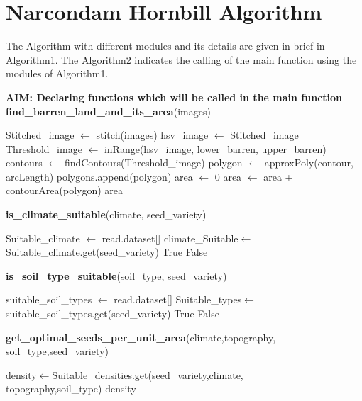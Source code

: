 \documentclass[conference]{IEEEtran}
\begin{document}
\section{Narcondam Hornbill Algorithm }
The Algorithm with different modules and its details are given in brief in Algorithm1.
\newline The Algorithm2 indicates the calling of the main function using the modules of Algorithm1.
\begin{algorithm} [ht]
\begin{scriptsize}
\begin{algorithmic}[1]
\label{algo1}

\STATE \textbf{AIM: Declaring functions which will be called in the main function}
\STATE \textbf{find\_barren\_land\_and\_its\_area}(images) 
    \begin{ALC@g}
    \STATE  Stitched\_image $\gets$ stitch(images)
    \STATE  hsv\_image $\gets$ Stitched\_image
    \STATE  Threshold\_image $\gets$ inRange(hsv\_image, lower\_barren, upper\_barren)
    \STATE  contours $\gets$ findContours(Threshold\_image)
        \STATE  polygon $\gets$ approxPoly(contour, arcLength)
        \STATE  polygons.append(polygon)
    \ENDFOR
    \STATE  area $\gets$ 0
    \STATE  area $\gets$ area + contourArea(polygon)
    \ENDFOR
    \RETURN  area
    \end{ALC@g}
\smallbreak

\STATE \textbf{is\_climate\_suitable}(climate, seed\_variety)
    \begin{ALC@g}
    \STATE Suitable\_climate $\gets$ read.dataset[]
    \STATE climate\_Suitable$\gets$Suitable\_climate.get(seed\_variety)
        \RETURN  True
    \ELSE
        \RETURN  False
    \ENDIF
    \end{ALC@g}
\smallbreak
\STATE \textbf{is\_soil\_type\_suitable}(soil\_type, seed\_variety)
    \begin{ALC@g}
    \STATE suitable\_soil\_types $\gets$ read.dataset[]
    \STATE Suitable\_types$\gets$suitable\_soil\_types.get(seed\_variety)
        \RETURN  True
    \ELSE
       \RETURN  False
    \ENDIF
    \end{ALC@g}
\smallbreak

\STATE \textbf{get\_optimal\_seeds\_per\_unit\_area}(climate,topography,\\soil\_type,seed\_variety) 
    \begin{ALC@g}
    \STATE  density$\gets$Suitable\_densities.get(seed\_variety,climate,\\topography,soil\_type)
    \RETURN  density
    \end{ALC@g}
\smallbreak


\end{algorithmic}
\end{scriptsize}
\end{algorithm}
\end{document}
